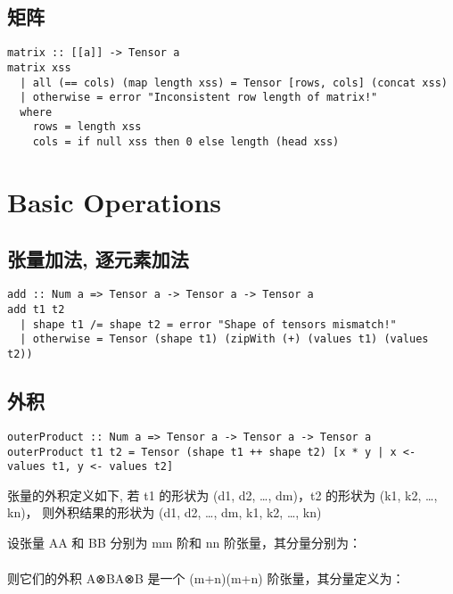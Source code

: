 \documentclass[11pt]{article}
\begin{document}
\subsection{矩阵}
\label{sec:orgf6f5d93}
\begin{verbatim}
matrix :: [[a]] -> Tensor a
matrix xss
  | all (== cols) (map length xss) = Tensor [rows, cols] (concat xss)
  | otherwise = error "Inconsistent row length of matrix!"
  where
    rows = length xss
    cols = if null xss then 0 else length (head xss)
\end{verbatim}

\section{Basic Operations}
\label{sec:org114f243}
\subsection{张量加法, 逐元素加法}
\label{sec:org9abb247}
\begin{verbatim}
add :: Num a => Tensor a -> Tensor a -> Tensor a
add t1 t2
  | shape t1 /= shape t2 = error "Shape of tensors mismatch!"
  | otherwise = Tensor (shape t1) (zipWith (+) (values t1) (values t2))
\end{verbatim}

\subsection{外积}
\label{sec:org41e2b7f}
\begin{verbatim}
outerProduct :: Num a => Tensor a -> Tensor a -> Tensor a
outerProduct t1 t2 = Tensor (shape t1 ++ shape t2) [x * y | x <- values t1, y <- values t2]
\end{verbatim}
张量的外积定义如下,
若 t1 的形状为 (d1, d2, \ldots{}, dm)，t2 的形状为 (k1, k2, \ldots{}, kn)，
则外积结果的形状为 (d1, d2, \ldots{}, dm, k1, k2, \ldots{}, kn)

设张量 AA 和 BB 分别为 mm 阶和 nn 阶张量，其分量分别为：
\begin{align}
[
\mathcal{A}{i_1, i_2, \dots, i_m}, \quad \mathcal{B}{j_1, j_2, \dots, j_n}
]
\end{align}

则它们的外积 A⊗BA⊗B 是一个 (m+n)(m+n) 阶张量，其分量定义为：
\begin{align}
[
(\mathcal{A} \otimes \mathcal{B}){i_1, \dots, i_m, j_1, \dots, j_n} = \mathcal{A}{i_1, \dots, i_m} \cdot \mathcal{B}_{j_1, \dots, j_n}
]
\end{align}
\end{document}

